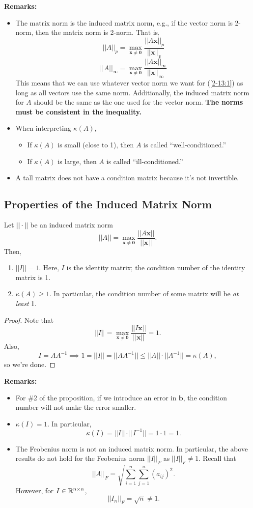 \documentclass[letterpaper]{article}
\newcommand{\0}{\mathbf{0}}
\renewcommand{\b}{\mathbf{b}}
\newcommand{\x}{\mathbf{x}}
\begin{document}
\textbf{Remarks:}
\begin{itemize}
    \item The matrix norm is the induced matrix norm, e.g., if the vector norm is 2-norm, then the matrix norm is 2-norm. That is, 
    \[||A||_p = \max_{\x \neq \0} \frac{||A\x||_p}{||\x||_p}\]
    \[||A||_\infty = \max_{\x \neq \0} \frac{||A\x||_\infty}{||\x||_\infty}\]
    This means that we can use whatever vector norm we want for (\ref{2-13:1}) as long as all vectors use the same norm. Additionally, the induced matrix norm for $A$ should be the same as the one used for the vector norm. \textbf{The norms must be consistent in the inequality.}
    \item When interpreting $\kappa(A)$, 
    \begin{itemize}
        \item If $\kappa(A)$ is small (close to 1), then $A$ is called ``well-conditioned.''
        \item If $\kappa(A)$ is large, then $A$ is called ``ill-conditioned.''
    \end{itemize}
    \item A tall matrix does not have a condition matrix because it's not invertible. 
\end{itemize} 

\subsection{Properties of the Induced Matrix Norm}
\begin{proposition}
    Let $||\cdot||$ be an induced matrix norm \[||A|| = \max_{\x \neq \0} \frac{||A\x||}{||\x||}.\] Then, 
    \begin{enumerate}
        \item $||I|| = 1$. Here, $I$ is the identity matrix; the condition number of the identity matrix is 1. 
        \item $\kappa(A) \geq 1$. In particular, the condition number of some matrix will be \emph{at least} 1. 
    \end{enumerate}
\end{proposition}
\begin{proof}
    Note that 
    \[||I|| = \max_{\x \neq \0} \frac{||I\x||}{||\x||} = 1.\]
    Also, 
    \[I = AA^{-1} \implies 1 = ||I|| = ||AA^{-1}|| \leq ||A|| \cdot ||A^{-1}|| = \kappa(A),\]
    so we're done.
\end{proof}

\textbf{Remarks:}
\begin{itemize}
    \item For \#2 of the proposition, if we introduce an error in $\b$, the condition number will not make the error smaller.
    \item $\kappa(I) = 1$. In particular, 
    \[\kappa(I) = ||I|| \cdot ||I^{-1}|| = 1 \cdot 1 = 1.\]
    \item The Feobenius norm is not an induced matrix norm. In particular, the above results do not hold for the Feobenius norm $||I||_F$ as $||I||_F \neq 1$. Recall that 
    \[||A||_F = \sqrt{\sum_{i = 1}^{n} \sum_{j = 1}^{n} (a_{ij})^2}.\]
    However, for $I \in \mathbb{R}^{n \times n}$, 
    \[||I_n||_F = \sqrt{n} \neq 1.\]
\end{itemize}
\end{document}
